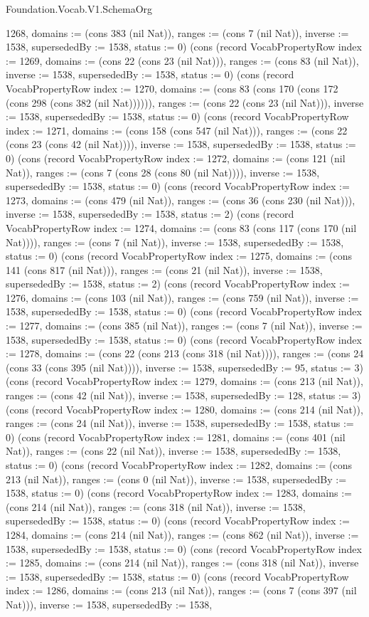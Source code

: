 \begin{lexlean}{Foundation.Vocab.V1.SchemaOrg}
\begin{semanticmodule}
{1268, domains := (cons 383 (nil Nat)), ranges := (cons 7 (nil Nat)), inverse := 1538, supersededBy := 1538, status := 0}) (cons (record VocabPropertyRow {index := 1269, domains := (cons 22 (cons 23 (nil Nat))), ranges := (cons 83 (nil Nat)), inverse := 1538, supersededBy := 1538, status := 0}) (cons (record VocabPropertyRow {index := 1270, domains := (cons 83 (cons 170 (cons 172 (cons 298 (cons 382 (nil Nat)))))), ranges := (cons 22 (cons 23 (nil Nat))), inverse := 1538, supersededBy := 1538, status := 0}) (cons (record VocabPropertyRow {index := 1271, domains := (cons 158 (cons 547 (nil Nat))), ranges := (cons 22 (cons 23 (cons 42 (nil Nat)))), inverse := 1538, supersededBy := 1538, status := 0}) (cons (record VocabPropertyRow {index := 1272, domains := (cons 121 (nil Nat)), ranges := (cons 7 (cons 28 (cons 80 (nil Nat)))), inverse := 1538, supersededBy := 1538, status := 0}) (cons (record VocabPropertyRow {index := 1273, domains := (cons 479 (nil Nat)), ranges := (cons 36 (cons 230 (nil Nat))), inverse := 1538, supersededBy := 1538, status := 2}) (cons (record VocabPropertyRow {index := 1274, domains := (cons 83 (cons 117 (cons 170 (nil Nat)))), ranges := (cons 7 (nil Nat)), inverse := 1538, supersededBy := 1538, status := 0}) (cons (record VocabPropertyRow {index := 1275, domains := (cons 141 (cons 817 (nil Nat))), ranges := (cons 21 (nil Nat)), inverse := 1538, supersededBy := 1538, status := 2}) (cons (record VocabPropertyRow {index := 1276, domains := (cons 103 (nil Nat)), ranges := (cons 759 (nil Nat)), inverse := 1538, supersededBy := 1538, status := 0}) (cons (record VocabPropertyRow {index := 1277, domains := (cons 385 (nil Nat)), ranges := (cons 7 (nil Nat)), inverse := 1538, supersededBy := 1538, status := 0}) (cons (record VocabPropertyRow {index := 1278, domains := (cons 22 (cons 213 (cons 318 (nil Nat)))), ranges := (cons 24 (cons 33 (cons 395 (nil Nat)))), inverse := 1538, supersededBy := 95, status := 3}) (cons (record VocabPropertyRow {index := 1279, domains := (cons 213 (nil Nat)), ranges := (cons 42 (nil Nat)), inverse := 1538, supersededBy := 128, status := 3}) (cons (record VocabPropertyRow {index := 1280, domains := (cons 214 (nil Nat)), ranges := (cons 24 (nil Nat)), inverse := 1538, supersededBy := 1538, status := 0}) (cons (record VocabPropertyRow {index := 1281, domains := (cons 401 (nil Nat)), ranges := (cons 22 (nil Nat)), inverse := 1538, supersededBy := 1538, status := 0}) (cons (record VocabPropertyRow {index := 1282, domains := (cons 213 (nil Nat)), ranges := (cons 0 (nil Nat)), inverse := 1538, supersededBy := 1538, status := 0}) (cons (record VocabPropertyRow {index := 1283, domains := (cons 214 (nil Nat)), ranges := (cons 318 (nil Nat)), inverse := 1538, supersededBy := 1538, status := 0}) (cons (record VocabPropertyRow {index := 1284, domains := (cons 214 (nil Nat)), ranges := (cons 862 (nil Nat)), inverse := 1538, supersededBy := 1538, status := 0}) (cons (record VocabPropertyRow {index := 1285, domains := (cons 214 (nil Nat)), ranges := (cons 318 (nil Nat)), inverse := 1538, supersededBy := 1538, status := 0}) (cons (record VocabPropertyRow {index := 1286, domains := (cons 213 (nil Nat)), ranges := (cons 7 (cons 397 (nil Nat))), inverse := 1538, supersededBy := 1538, }
\end{semanticmodule}
\end{lexlean}

